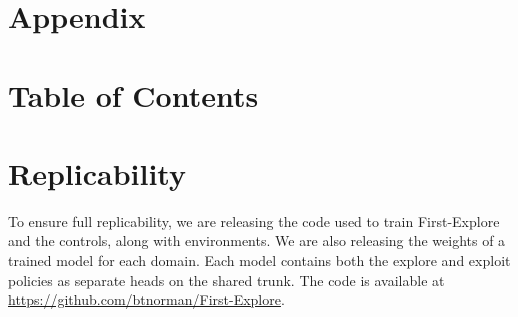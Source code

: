 \documentclass{article}
\begin{document}


\pagebreak
\appendix
\pagebreak

\section*{\LARGE \centering Appendix}

\startcontents[appendices]

\section*{Table of Contents}
\vfill
\pagebreak

\section{Replicability}

To ensure full replicability, we are releasing the code used to train First-Explore and the controls, along with environments. We are also releasing the weights of a trained model for each domain. Each model contains both the explore and
exploit policies as separate heads on the shared trunk. The code is available at \url{https://github.com/btnorman/First-Explore}.
\end{document}
